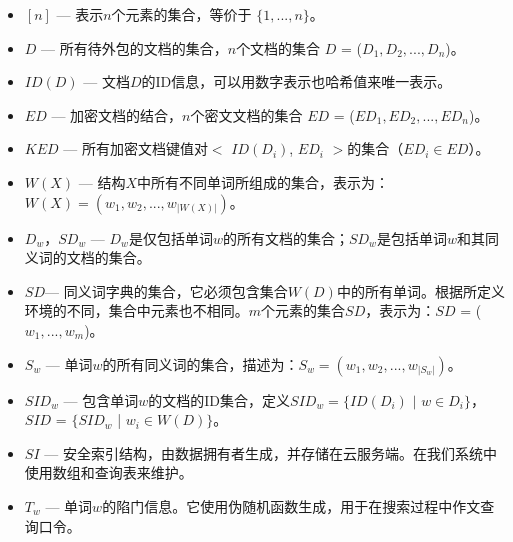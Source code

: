 \begin{itemize}

  \item
  $ [n] $ --- 表示$n$个元素的集合，等价于 $\{ 1, ..., n \}$。


  \item
  $D$ --- 所有待外包的文档的集合，$n$个文档的集合 $D$ = ($ D_1, D_2, ..., D_n $)。

  \item
  $ID(D)$ --- 文档$D$的ID信息，可以用数字表示也哈希值来唯一表示。

  \item
  $ED$ --- 加密文档的结合，$n$个密文文档的集合 $ED$ = ($ ED_1, ED_2, ..., ED_n $)。

  \item
  $KED$ --- 所有加密文档键值对$<$ $ID(D_i)$, $ED_i$ $>$的集合（$ ED_i \in ED $）。

  \item
  $W(X)$ --- 结构$X$中所有不同单词所组成的集合，表示为：$W(X) = (w_1, w_2, ..., w_{|W(X)|})$。

  \item
  $D_w，SD_w$ --- $D_w$是仅包括单词$w$的所有文档的集合；$SD_w$是包括单词$w$和其同义词的文档的集合。

  \item
  {$SD$}--- 同义词字典的集合，它必须包含集合$W(D)$中的所有单词。根据所定义环境的不同，集合中元素也不相同。$m$个元素的集合$SD$，表示为：$SD$ = ($ w_1, ..., w_m $)。

  \item
  $ S_w $ --- 单词$w$的所有同义词的集合，描述为：$ S_w = (w_1, w_2, ..., w_{|S_w|}) $。

   \item
  $ SID_w $ --- 包含单词$w$的文档的ID集合，定义$ SID_w = \{ID(D_i) $ $|$ $ w \in D_i\}$， $SID$ = $\{SID_w$ | $w_i \in W(D) \} $。

  \item
  ${SI}$ --- 安全索引结构，由数据拥有者生成，并存储在云服务端。在我们系统中使用数组和查询表来维护。

  \item
  $ T_w $ --- 单词$w$的陷门信息。它使用伪随机函数生成，用于在搜索过程中作文查询口令。


\end{itemize}
